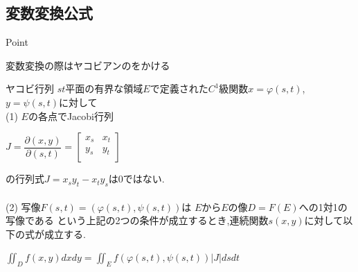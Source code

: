 \documentclass[a4paper]{jsarticle}
\begin{document}
\subsection{変数変換公式}
\begin{itembox}[l]{Point}
    \begin{center}
        変数変換の際はヤコビアンのをかける
    \end{center}
\end{itembox}
\begin{itembox}[l]{ヤコビ行列}
    $st$平面の有界な領域$E$で定義された$C^1$級関数$x=\varphi\left(s,t\right)$,$y=\psi\left(s,t\right)$に対して\\
    (1) $E$の各点でJacobi行列
    \begin{center}
        $J=\dfrac{\partial\left(x,y\right)}{\partial\left(s,t\right)}=
            \begin{bmatrix}
                x_s & x_t \\
                y_s & y_t \\
            \end{bmatrix}
        $
    \end{center}
    の行列式$J=x_sy_t-x_ty_s$は$0$ではない.\\\\
    (2) 写像$F\left(s,t\right)=\left(\varphi\left(s,t\right),\psi\left(s,t\right)\right)$は
    $E$から$E$の像$D=F\left(E\right)$への1対1の写像である
    という上記の2つの条件が成立するとき,連続関数$s\left(x,y\right)$に対して以下の式が成立する.\\
    \begin{center}
        $\displaystyle\iint_Df\left(x,y\right)dxdy=\iint_Ef\left(\varphi\left(s,t\right),\psi\left(s,t\right)\right)|J|dsdt$
    \end{center}
\end{itembox}
\end{document}
